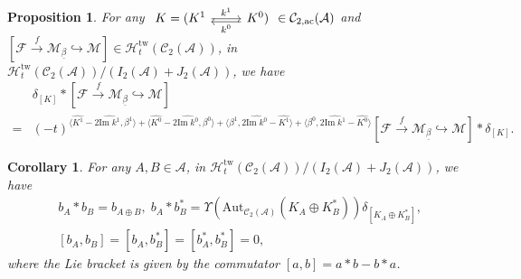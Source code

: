 \documentclass[10pt,a4paper]{amsart}
\newtheorem{proposition}{Proposition}
\newtheorem{corollary}{Corollary}
\begin{document}
\begin{proposition}
     \label{KX=XK}
     For any   $ \begin{tikzcd}
    K = (K^1 \arrow[r,"k^1"] & K^0) \arrow[l, shift left,"k^0"] \end{tikzcd} \in \mathcal{C}_{2,\mathrm{ac}}(\mathcal{A}) $ and $ [\mathcal{F} \xrightarrow{f} \mathcal{M}_{\underline{\beta}} \hookrightarrow \mathcal{M} ] \in \mathcal{H}_t^{\mathrm{tw}}(\mathcal{C}_2(\mathcal{A})) $, in $ \mathcal{H}_t^{\mathrm{tw}}(\mathcal{C}_2(\mathcal{A}))/(I_2(\mathcal{A})+J_2(\mathcal{A})) $, we have
     \begin{align*}
         &\delta_{[K]} * [\mathcal{F} \xrightarrow{f} \mathcal{M}_{\underline{\beta}} \hookrightarrow \mathcal{M} ] \\
         =& (-t)^{\langle \widehat{K^1} - 2 \widehat{\mathrm{Im}\;k^1},\beta^1 \rangle + \langle \widehat{K^0} - 2 \widehat{\mathrm{Im}\;k^0},\beta^0 \rangle + \langle \beta^1,2 \widehat{\mathrm{Im}\;k^0}-\widehat{K^1}  \rangle + \langle \beta^0, 2 \widehat{\mathrm{Im}\;k^1}-\widehat{K^0}\rangle}[\mathcal{F} \xrightarrow{f} \mathcal{M}_{\underline{\beta}} \hookrightarrow \mathcal{M} ] * \delta_{[K]}.
     \end{align*}
     
\end{proposition}

\begin{corollary}
    \label{bAbB}
    For any $ A,B \in \mathcal{A} $, in $ \mathcal{H}_t^{\mathrm{tw}}(\mathcal{C}_2(\mathcal{A}))/(I_2(\mathcal{A})+J_2(\mathcal{A})) $, we have
    \begin{align*}
        &b_A * b_B = b_{A \oplus B},\;b_A * b_B^* = \Upsilon(\mathrm{Aut}_{\mathcal{C}_2(\mathcal{A})}(K_A \oplus K_B^*))\delta_{[K_A \oplus K_B^*]},\\
        &[b_A,b_B] = [b_A,b_B^*] = [b_A^*,b_B^*]=0,
    \end{align*}
    where the Lie bracket is given by the commutator $ [a,b] = a * b - b * a $.
\end{corollary}
\end{document}
